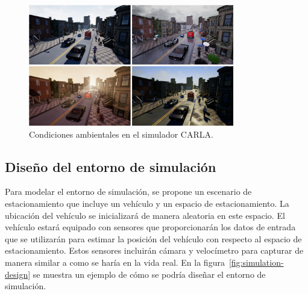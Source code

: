 \begin{figure}[!ht]
    \centering
    \includegraphics[width=0.8\textwidth]{img/carla_clima_example}
    \caption{Condiciones ambientales en el simulador CARLA.}
    \label{fig:carla-simulator}
\end{figure}


\subsection{Diseño del entorno de simulación}\label{subsec:simulation-design}
\noindent
Para modelar el entorno de simulación, se propone un escenario de estacionamiento que incluye un vehículo y un espacio de estacionamiento.
La ubicación del vehículo se inicializará de manera aleatoria en este espacio.
El vehículo estará equipado con sensores que proporcionarán los datos de entrada que se utilizarán para estimar la posición del vehículo con respecto al espacio de estacionamiento.
Estos sensores incluirán cámara y velocímetro para capturar de manera similar a como se haría en la vida real.
En la figura~\ref{fig:simulation-design} se muestra un ejemplo de cómo se podría diseñar el entorno de simulación.


